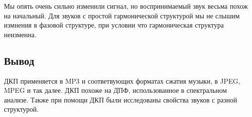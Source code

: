 Мы опять очень сильно изменили сигнал, но воспринимаемый звук весьма похож на начальный. Для звуков с простой гармонической структурой мы не слышим измнения в фазовой структуре, при условии что гармоническая структура неизменна.

\subsection{Вывод}

ДКП применяется в MP3 и соответвующих форматах сжатия музыки, в JPEG, MPEG и так далее. ДКП похоже на ДПФ, использованное в спектральном анализе. Также при помощи ДКП были исследованы свойства звуков с разной структурой.